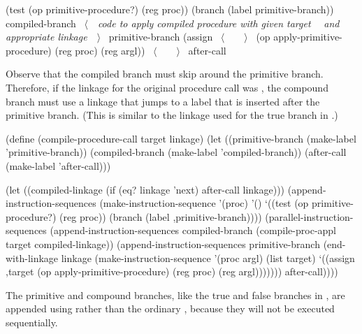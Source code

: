 \begin{codeBlock}
(test (op primitive-procedure?) (reg proc))
 (branch (label primitive-branch))
compiled-branch
 ~\(\langle \)~~\emph{code to apply compiled procedure with given target}~
  ~\emph{and appropriate linkage}~~\(\rangle \)~
primitive-branch
 (assign ~\(\langle \)~~~~\(\rangle \)~
         (op apply-primitive-procedure)
         (reg proc)
         (reg argl))
 ~\(\langle \)~~~~\(\rangle \)~
after-call
\end{codeBlock}

\noindent
Observe that the compiled branch must skip around the primitive branch.
Therefore, if the linkage for the original procedure call was , the
compound branch must use a linkage that jumps to a label that is inserted after
the primitive branch.  (This is similar to the linkage used for the true branch
in .)

\begin{codeBlock}
(define (compile-procedure-call target linkage)
  (let ((primitive-branch
          (make-label 'primitive-branch))
        (compiled-branch
          (make-label 'compiled-branch))
        (after-call
          (make-label 'after-call)))

    (let ((compiled-linkage
            (if (eq? linkage 'next)
                after-call
                linkage)))
      (append-instruction-sequences
        (make-instruction-sequence
          '(proc) '()
          `((test (op primitive-procedure?)
                  (reg proc))
            (branch (label ,primitive-branch))))
        (parallel-instruction-sequences
          (append-instruction-sequences
            compiled-branch
            (compile-proc-appl target
                               compiled-linkage))
          (append-instruction-sequences
            primitive-branch
            (end-with-linkage
              linkage
              (make-instruction-sequence
                '(proc argl)
                (list target)
                `((assign
                    ,target
                    (op
                      apply-primitive-procedure)
                    (reg proc)
                    (reg argl)))))))
        after-call))))
\end{codeBlock}

\noindent
The primitive and compound branches, like the true and false branches in
, are appended using 
rather than the ordinary , because they will
not be executed sequentially.

